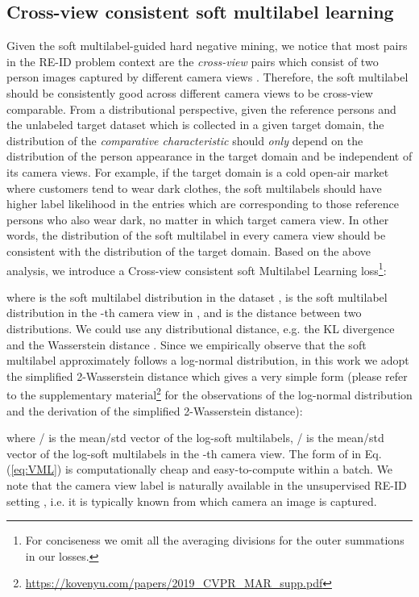 \documentclass[10pt,twocolumn,letterpaper]{article}
\newcommand{\Koven}{\color{black}}
\begin{document}
\subsection{Cross-view consistent soft multilabel learning}\label{sec:soft multilabel_learning}
Given the soft multilabel-guided hard negative mining,
we notice that most pairs in the RE-ID problem context are the \emph{cross-view} pairs
which consist of two person images captured by different camera views \cite{2017_ICCV_asymmetric}.
Therefore, {\Koven
the soft multilabel should be consistently good across different camera views
to be cross-view comparable.
}
From a distributional perspective,
given the reference persons and the unlabeled target dataset
 which is collected in a given target domain,
the distribution of the \emph{comparative characteristic} should
\emph{only} depend on the distribution of the person appearance in
the target domain and be independent of its camera views.
For example, if the target domain is a cold open-air market where
customers tend to wear dark clothes,
the soft multilabels should have higher label likelihood in the entries which are corresponding to those reference persons who also wear dark,
no matter in which target camera view.
In other words, the distribution of the soft multilabel in every camera
view should be consistent with the distribution of the target domain.
Based on the above analysis,
we introduce a Cross-view consistent soft Multilabel Learning
loss\footnote{For conciseness we omit all the averaging divisions for
  the outer summations in our losses.}:
{\small

}where  is the soft multilabel distribution in the dataset ,
 is the soft multilabel distribution in the -th camera view in ,
and  is the distance between two distributions.
We could use any distributional distance, e.g. the KL divergence \cite{2014_NIPS_GAN} and the Wasserstein distance \cite{2017_ICML_WGAN}.
Since we empirically observe that the soft multilabel approximately follows a log-normal distribution,
in this work we adopt the simplified 2-Wasserstein distance \cite{2017_Arxiv_BEGAN,2018_TPAMI_WCNN} which gives a very simple form
(please refer to the supplementary material\footnote{\url{https://kovenyu.com/papers/2019_CVPR_MAR_supp.pdf}}
for the observations of the log-normal distribution and the derivation of the simplified 2-Wasserstein distance):
{\small

}where / is the mean/std vector of the log-soft multilabels,
 / is the mean/std vector of the log-soft multilabels in the -th camera view.
The form of  in Eq. (\ref{eq:VML}) is computationally cheap
and easy-to-compute within a batch. We note that the camera view label is naturally available in the unsupervised RE-ID setting \cite{2017_ICCV_asymmetric,2018_ECCV_HHL},
i.e. it is typically known from which camera an image is captured.
\end{document}
